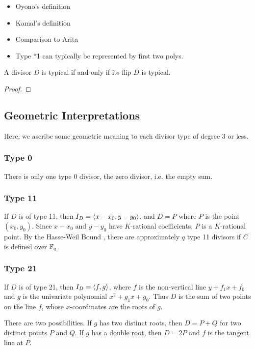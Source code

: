 \begin{itemize}
  \item Oyono's definition
  \item Kamal's definition
  \item Comparison to Arita
  \item Type *1 can typically be represented by first two polys.
\end{itemize}

\begin{theorem}
  A divisor $D$ is typical if and only if its flip $\bar D$ is typical.
\end{theorem}
\begin{proof}
\end{proof}



\subsection{Geometric Interpretations}

Here, we ascribe some geometric meaning to each divisor type of degree 3 or less.

\subsubsection{Type 0}
  There is only one type 0 divisor, the zero divisor, i.e. the empty sum.

\subsubsection{Type 11}
  If $D$ is of type 11, then $I_D = \left\langle x - x_0, y - y_0 \right\rangle$, and $D = P$ where $P$ is the point $(x_0, y_0)$.
  Since $x - x_0$ and $y - y_0$ have $K$-rational coefficients, $P$ is a $K$-rational point.
  By the Hasse-Weil Bound , there are approximately $q$ type 11 divisors if $C$ is defined over $\mathbb{F}_q$.

\subsubsection{Type 21}
  If $D$ is of type 21, then $I_D = \left\langle f, g \right\rangle$, where $f$ is the non-vertical line $y + f_1x + f_0$
  and $g$ is the univariate polynomial $x^2 + g_1x + g_0$.
  Thus $D$ is the sum of two points on the line $f$, whose $x$-coordinates are the roots of $g$.
  
  There are two possibilities.
  If $g$ has two distinct roots, then $D = P + Q$ for two distinct points $P$ and $Q$.
  If $g$ has a double root, then $D = 2P$ and $f$ is the tangent line at $P$.
  
